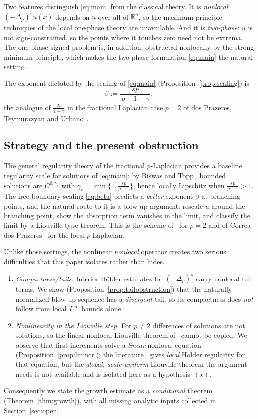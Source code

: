 \documentclass[11pt]{amsart}
\theoremstyle{plain}
\theoremstyle{definition}
\theoremstyle{remark}
\newcommand{\R}{\mathbb{R}}
\newcommand{\fpl}[1]{(-\Delta_p)^{s}#1}
\begin{document}
Two features distinguish \eqref{eq:main} from the classical theory. It is
\emph{nonlocal}: $\fpl{u}(x)$ depends on $u$ over all of $\R^n$, so the
maximum-principle techniques of the local one-phase theory are unavailable.
And it is \emph{two-phase}: $u$ is not sign-constrained, so the points where
it touches zero need not be extrema. The one-phase signed problem is, in
addition, obstructed nonlocally by the strong minimum principle, which makes
the two-phase formulation \eqref{eq:main} the natural setting.

The exponent dictated by the scaling of \eqref{eq:main}
(Proposition~\ref{prop:scaling}) is
\begin{equation}\label{eq:beta}
  \beta:=\frac{sp}{\,p-1-\gamma\,},
\end{equation}
the analogue of $\frac{2s}{1-\gamma}$ in the fractional Laplacian case
$p=2$ of dos Prazeres, Teymurazyan and Urbano~\cite{PTU}.

\subsection{Strategy and the present obstruction}
The general regularity theory of the fractional $p$-Laplacian provides a
baseline regularity scale for solutions of \eqref{eq:main}: by Biswas and
Topp~\cite{BT} bounded solutions are $C^{0,\gamma_\circ}$ with
$\gamma_\circ=\min\{1,\frac{sp}{p-1}\}$, hence locally Lipschitz when
$\frac{sp}{p-1}>1$. The free-boundary scaling \eqref{eq:beta} predicts a
\emph{better} exponent $\beta$ at branching points, and the natural route to it
is a blow-up argument: rescale $u$ around the branching point, show the
absorption term vanishes in the limit, and classify the limit by a
Liouville-type theorem. This is the scheme of~\cite{PTU} for $p=2$ and of
Correa--dos Prazeres~\cite{CP} for the local $p$-Laplacian.

Unlike those settings, the nonlinear \emph{nonlocal} operator creates two
serious difficulties that this paper isolates rather than hides.
\begin{enumerate}[leftmargin=2em]
\item \emph{Compactness/tails.} Interior H\"older estimates for $\fpl{}$ carry
nonlocal tail terms. We show (Proposition~\ref{prop:tailobstruction}) that the
naturally normalized blow-up sequence has a \emph{divergent} tail, so its
compactness does \emph{not} follow from local $L^\infty$ bounds alone.
\item \emph{Nonlinearity in the Liouville step.} For $p\neq2$ differences of
solutions are not solutions, so the linear-nonlocal Liouville theorem
of~\cite{PTU} cannot be copied. We observe that first increments solve a
\emph{linear} nonlocal equation (Proposition~\ref{prop:linincr}); the
literature~\cite{BLS,GJS} gives \emph{local} H\"older regularity for that
equation, but the \emph{global, scale-uniform} Liouville theorem the argument
needs is not available and is isolated here as a hypothesis~$(\star)$.
\end{enumerate}
Consequently we state the growth estimate as a \emph{conditional} theorem
(Theorem~\ref{thm:growth}), with all missing analytic inputs collected in
Section~\ref{sec:open}.
\end{document}
